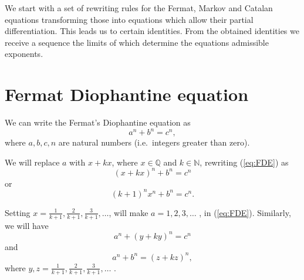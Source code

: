 \documentclass[11pt]{article}
\begin{document}
We start with a set of rewriting rules for the Fermat, Markov and Catalan equations
transforming those into equations which allow their partial differentiation.
This leads us to certain identities. From the obtained identities we
receive a sequence the limits of which determine the equations admissible exponents.


\section{Fermat Diophantine equation}

We can write the Fermat's Diophantine equation %
as
\begin{equation}
\label{eq:FDE}
a^{n} + b^{n} = c^{n},
\end{equation}
where $a, b, c, n$ are natural numbers (i.e.~integers greater than zero).


We will replace $a$ with $x + kx$, where $x \in \mathbb{Q}$ and $k \in \mathbb{N}$, rewriting (\ref{eq:FDE}) as
\begin{equation}
\label{eq:FDE_rewritten}
(x + kx)^{n} + b^{n} = c^{n}
\end{equation}
or
\begin{equation}
\label{eq:FDE_rewritten_x}
(k + 1)^{n} x^{n} + b^{n} = c^{n}.
\end{equation}

Setting $x = \frac{1}{k+1}, \frac{2}{k+1}, \frac{3}{k+1}, \ldots$,
will make $a = 1, 2, 3, \ldots$ , in (\ref{eq:FDE}).
Similarly, we will have
\begin{equation}
\label{eq:FDE_rewritten_Y}
a^{n} + (y + ky)^{n} = c^{n}
\end{equation}
and
\begin{equation}
\label{eq:FDE_rewritten_Z}
a^{n} + b^{n} = (z + kz)^{n},
\end{equation}
where $y, z = \frac{1}{k+1}, \frac{2}{k+1}, \frac{3}{k+1}, \ldots$ \@.

\end{document}
